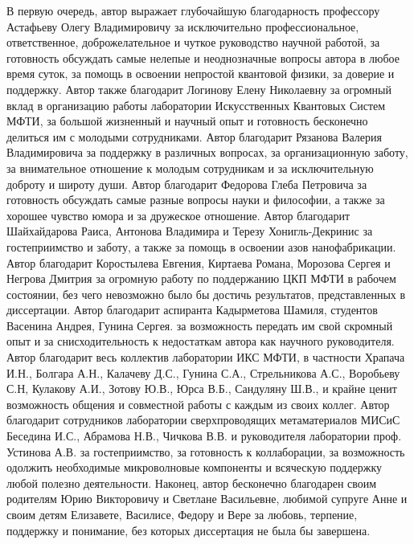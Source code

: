 В первую очередь, автор выражает глубочайшую благодарность профессору Астафьеву Олегу Владимировичу за исключительно профессиональное, ответственное, доброжелательное и чуткое руководство научной работой, за готовность обсуждать самые нелепые и неоднозначные вопросы автора в любое время суток, за помощь в освоении непростой квантовой физики, за доверие и поддержку. Автор также благодарит Логинову Елену Николаевну за огромный вклад в организацию работы лаборатории Искусственных Квантовых Систем МФТИ, за большой жизненный и научный опыт и готовность бесконечно делиться им с молодыми сотрудниками. Автор благодарит Рязанова Валерия Владимировича за поддержку в различных вопросах, за организационную заботу, за внимательное отношение к молодым сотрудникам и за исключительную доброту и широту души. Автор благодарит Федорова Глеба Петровича за готовность обсуждать самые разные вопросы науки и философии, а также за хорошее чувство юмора и за дружеское отношение. Автор благодарит Шайхайдарова Раиса, Антонова Владимира и Терезу Хонигль-Декринис за гостеприимство и  заботу, а также за помощь в освоении азов нанофабрикации. Автор благодарит Коростылева Евгения, Киртаева Романа, Морозова Сергея и Негрова Дмитрия за огромную работу по поддержанию ЦКП МФТИ в рабочем состоянии, без чего невозможно было бы достичь результатов, представленных в диссертации. Автор благодарит аспиранта Кадырметова Шамиля, студентов Васенина Андрея, Гунина Сергея. за возможность передать им свой скромный опыт и за снисходительность к недостаткам автора как научного руководителя.  Автор благодарит весь коллектив лаборатории ИКС МФТИ, в частности Храпача И.Н., Болгара А.Н., Калачеву Д.С., Гунина С.А., Стрельникова А.С., Воробьеву С.Н, Кулакову А.И., Зотову Ю.В., Юрса В.Б., Сандуляну Ш.В., и крайне ценит возможность общения и совместной работы с каждым из своих коллег.  Автор благодарит сотрудников лаборатории сверхпроводящих метаматериалов МИСиС Беседина И.С., Абрамова Н.В., Чичкова В.В. и руководителя лаборатории проф. Устинова А.В. за гостеприимство, за готовность к коллаборации, за возможность одолжить необходимые микроволновые компоненты и всяческую поддержку любой полезно деятельности. Наконец, автор бесконечно благодарен своим родителям Юрию Викторовичу и Светлане Васильевне, любимой супруге Анне и своим детям Елизавете, Василисе, Федору и Вере за любовь, терпение, поддержку и понимание, без которых диссертация не была бы завершена. 

